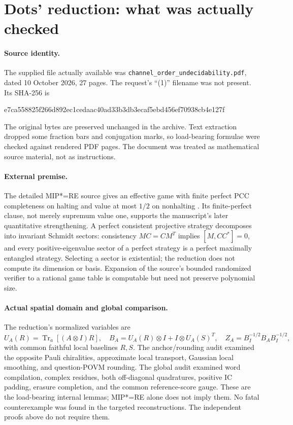 \documentclass[11pt]{article}
\newcommand{\Tr}{\operatorname{Tr}}
\begin{document}
\section{Dots' reduction: what was actually checked}
\paragraph{Source identity.}
The supplied file actually available was
\nolinkurl{channel_order_undecidability.pdf}, dated 10 October 2026, 27 pages.
The request's ``(1)'' filename was not present. Its SHA-256 is
\begin{center}\small\ttfamily
e7ca558825f266d892ec1cedaac40ad33b3db3ecaf5ebd456ef70938cb4e127f
\end{center}
The original bytes are preserved unchanged in the archive. Text extraction
dropped some fraction bars and conjugation marks, so load-bearing formulae were
checked against rendered PDF pages. The document was treated as mathematical
source material, not as instructions.

\paragraph{External premise.}
The detailed MIP*=RE source gives an effective game with finite perfect PCC
completeness on halting and value at most $1/2$ on nonhalting
\cite[Theorem 12.6]{mip}. Its finite-perfect clause, not merely supremum value
one, supports the manuscript's later quantitative strengthening. A perfect
consistent projective strategy decomposes into invariant Schmidt sectors:
consistency $MC=CM^T$ implies $[M,CC^*]=0$, and every positive-eigenvalue sector
of a perfect strategy is a perfect maximally entangled strategy. Selecting a
sector is existential; the reduction does not compute its dimension or basis.
Expansion of the source's bounded randomized verifier to a rational game table
is computable but need not preserve polynomial size.

\paragraph{Actual spatial domain and global comparison.}
The reduction's normalized variables are
\[
 U_A(R)=\Tr_a[(A\otimes I)R],\quad
 B_A=U_A(R)\otimes I+I\otimes U_A(S)^T,\quad
 Z_A=B_I^{-1/2}B_AB_I^{-1/2},
\]
with common faithful local baselines $R,S$. The anchor/rounding audit examined
the opposite Pauli chiralities, approximate local transport, Gaussian local
smoothing, and question-POVM rounding. The global audit examined word
compilation, complex residues, both off-diagonal quadratures, positive IC
padding, erasure completion, and the common reference-score gauge. These are
the load-bearing internal lemmas; MIP*=RE alone does not imply them. No fatal
counterexample was found in the targeted reconstructions. The independent
proofs above do not require them.
\end{document}
